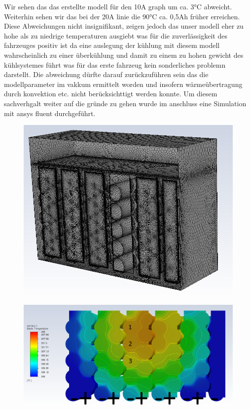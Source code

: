 Wir sehen das das erstellte modell für den 10A graph um ca. 3°C abweicht. Weiterhin sehen wir das bei der 20A linie die 90°C ca. 0,5Ah früher erreichen. Diese Abweichungen nicht insignifikant, zeigen jedoch das unser modell eher zu hohe als zu niedrige temperaturen ausgiebt was für die zuverlässigkeit des fahrzeuges positiv ist da eine auslegung der kühlung mit diesem modell wahrscheinlich zu einer überkühlung und damit zu einem zu hohen gewicht des kühlsystemes führt was für das erste fahrzeug kein sonderliches problemn darstellt. Die abweichung dürfte darauf zurückzuführen sein das die modellparameter im vakkum ermittelt worden und insofern wärmeübertragung durch konvektion etc. nicht berücksichttigt werden konnte. Um diesem sachverhgalt weiter auf die gründe zu gehen wurde im anschluss eine Simulation mit ansys fluent durchgeführt.

\begin{figure}[h]
	\centering
	\includegraphics[width=0.7\linewidth]{bilder/Accu_Sim_therm_7_2A_45min_simple_mesh}
	\caption{}
	\label{fig:accusimtherm72a45minsimplemesh}
\end{figure}

\begin{figure}[h]
	\centering
	\includegraphics[width=0.7\linewidth]{bilder/Accu_Sim_therm_7_2A_45min_simple}
	\caption{}
	\label{fig:accusimtherm72a45minsimple}
\end{figure}

